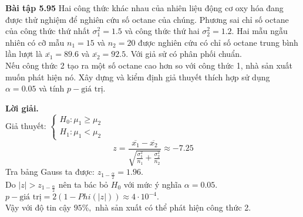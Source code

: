 \begin{mybox}
\textbf{Bài tập 5.95} Hai công thức khác nhau của nhiên liệu động cơ oxy hóa đang được thử nghiệm để nghiên cứu số octane của chúng. Phương sai chỉ số octane của công thức thứ nhất $\sigma_1^2 = 1.5$ và công thức thứ hai $\sigma_2^2 = 1.2.$ Hai mẫu ngẫu nhiên có cỡ mẫu $n_1 = 15$ và $n_2 = 20$ được nghiên cứu có chỉ số octane trung bình lần lượt là $\overline{x_1} = 89.6$ và $\overline{x_2} = 92.5.$ Với giả sử có phân phối chuẩn.\\
Nếu công thức 2 tạo ra một số octane cao hơn so với công thức 1, nhà sản xuất muốn phát hiện nó. Xây dựng và kiểm định giả thuyết thích hợp sử dụng $\alpha = 0.05$ và tính $p-\text{giá trị}.$
\end{mybox}
\textbf{Lời giải.} \\
Giả thuyết: $\begin{cases}
H_0: \mu_1 \geqslant \mu_2\\
H_1: \mu_1 < \mu_2
\end{cases}$\\
$$z = \frac{{\overline {{x_1}}  - \overline {{x_2}} }}{{\sqrt {\frac{{\sigma _1^2}}{{{n_1}}} + \frac{{\sigma _2^2}}{{{n_2}}}} }} \approx -7.25$$
Tra bảng Gauss ta được: $z_{1 - \frac{\alpha}{2}} = 1.96.$\\
Do $\left| z \right| > z_{1 - \frac{\alpha}{2}}$ nên ta bác bỏ $H_0$ với mức ý nghĩa $\alpha = 0.05.$\\
$p-\text{giá trị} = 2 \left( {1 - Phi \left( {\left| z \right|} \right)} \right) \approx  4 \cdot 10^{-4}.$\\
Vậy với độ tin cậy $95\%,$ nhà sản xuất có thể phát hiện công thức 2.


